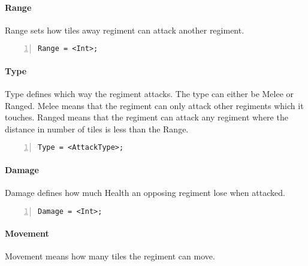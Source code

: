 		\paragraph{Range}
			Range sets how tiles away regiment can attack another regiment.

\begin{lstlisting}[basicstyle=\small\sffamily,
keywordstyle={\color{blue}},
comment={[l]{//}}, morecomment={[s]{/*}{*/}}, commentstyle=\itshape,
columns={[l]flexible}, numbers=left, numberstyle=\tiny,
frameround=fftt, frame=shadowbox, captionpos=b,
caption={Regiment Assignment}]
Range = <Int>;
\end{lstlisting}
		\paragraph{Type}
			Type defines which way the regiment attacks. The type can either be Melee or Ranged.
			Melee means that the regiment can only attack other regiments which it touches. Ranged means 
			that the regiment can attack any regiment where the distance in number of tiles is less than the Range.

		\begin{lstlisting}[basicstyle=\small\sffamily,
		keywordstyle={\color{blue}},
		comment={[l]{//}}, morecomment={[s]{/*}{*/}}, commentstyle=\itshape,
		columns={[l]flexible}, numbers=left, numberstyle=\tiny,
		frameround=fftt, frame=shadowbox, captionpos=b,
		caption={Regiment Assignment},
		label=RegimentAssignment]
				Type = <AttackType>; 
			\end{lstlisting}	
		\paragraph{Damage}
			Damage defines how much Health an opposing regiment lose when attacked.

		\begin{lstlisting}[basicstyle=\small\sffamily,
		keywordstyle={\color{blue}},
		comment={[l]{//}}, morecomment={[s]{/*}{*/}}, commentstyle=\itshape,
		columns={[l]flexible}, numbers=left, numberstyle=\tiny,
		frameround=fftt, frame=shadowbox, captionpos=b,
		caption={Regiment Assignment},
		label=RegimentAssignment]
				Damage = <Int>;
			\end{lstlisting}
		\paragraph{Movement}
			Movement means how many tiles the regiment can move.


